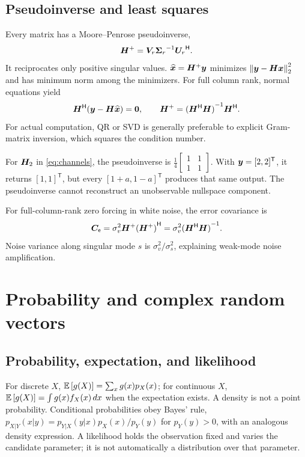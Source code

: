 \subsection{Pseudoinverse and least squares}
Every matrix has a Moore--Penrose pseudoinverse,
\begin{equation}
{\bm{H}}^{+}=\bm{V}_r{\bm{\Sigma}_r}^{-1}{\bm{U}_r}^{\mathsf{H}}.
\end{equation}
It reciprocates only positive singular values. $\widehat{\bm{x}}={\bm{H}}^{+}\bm{y}$ minimizes $\left\|\bm{y}-\bm{H}\bm{x}\right\|_2^2$ and has minimum norm among the minimizers. For full column rank, normal equations yield
\begin{equation}
{\bm{H}}^{\mathsf{H}}(\bm{y}-\bm{H}\widehat{\bm{x}})=\bm{0},\qquad
{\bm{H}}^{+}={({\bm{H}}^{\mathsf{H}}\bm{H})}^{-1}{\bm{H}}^{\mathsf{H}}.
\end{equation}
For actual computation, QR or SVD is generally preferable to explicit Gram-matrix inversion, which squares the condition number.

For $\bm{H}_2$ in \eqref{eq:channels}, the pseudoinverse is $\frac14\begin{bmatrix}1&1\\1&1\end{bmatrix}$. With $\bm{y}=[2,2]^{\mathsf T}$, it returns $[1,1]^{\mathsf T}$, but every $[1+a,1-a]^{\mathsf T}$ produces that same output. The pseudoinverse cannot reconstruct an unobservable nullspace component.

For full-column-rank zero forcing in white noise, the error covariance is
\begin{equation}
\bm{C}_{\mathsf e}=\sigma_v^2{\bm{H}}^{+}{({\bm{H}}^{+})}^{\mathsf{H}}
=\sigma_v^2{({\bm{H}}^{\mathsf{H}}\bm{H})}^{-1}.
\end{equation}
Noise variance along singular mode $s$ is $\sigma_v^2/\sigma_s^2$, explaining weak-mode noise amplification.

\section{Probability and complex random vectors}\label{app:probability}
\subsection{Probability, expectation, and likelihood}
For discrete $X$, $\mathbb{E}\left[g(X)\right]=\sum_xg(x)p_X(x)$; for continuous $X$, $\mathbb{E}\left[g(X)\right]=\int g(x)f_X(x)\,dx$ when the expectation exists. A density is not a point probability. Conditional probabilities obey Bayes' rule, $p_{X|Y}(x|y)=p_{Y|X}(y|x)p_X(x)/p_Y(y)$ for $p_Y(y)>0$, with an analogous density expression. A likelihood holds the observation fixed and varies the candidate parameter; it is not automatically a distribution over that parameter.

